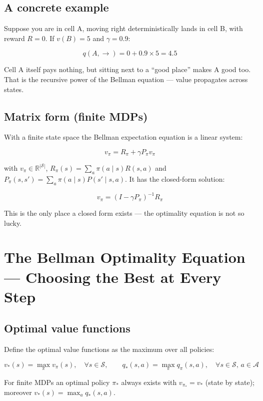 \documentclass{article}
\begin{document}
\subsection*{A concrete example}

Suppose you are in cell A, moving right deterministically lands in cell B, with reward $R=0$. If $v(B)=5$ and $\gamma=0.9$:

\[
q(A, \rightarrow) = 0 + 0.9 \times 5 = 4.5
\]

Cell A itself pays nothing, but sitting next to a ``good place'' makes A good too. That is the recursive power of the Bellman equation --- value propagates across states.

\subsection*{Matrix form (finite MDPs)}

With a finite state space the Bellman expectation equation is a linear system:

\[
\boxed{v_\pi = R_\pi + \gamma P_\pi v_\pi}
\]

with $v_\pi\in\mathbb{R}^{|\mathcal{S}|}$, $R_\pi(s)=\sum_a \pi(a\mid s)R(s,a)$ and $P_\pi(s,s')=\sum_a \pi(a\mid s)P(s'\mid s,a)$. It has the closed-form solution:

\[
v_\pi = (I - \gamma P_\pi)^{-1} R_\pi
\]

This is the only place a closed form exists --- the optimality equation is not so lucky.

\section*{The Bellman Optimality Equation --- Choosing the Best at Every Step}

\subsection*{Optimal value functions}

Define the optimal value functions as the maximum over all policies:

\[
v_*(s) = \max_\pi v_\pi(s),\quad \forall s\in\mathcal{S}, \qquad
q_*(s,a) = \max_\pi q_\pi(s,a),\quad \forall s\in\mathcal{S},\, a\in\mathcal{A}
\]

For finite MDPs an optimal policy $\pi_*$ always exists with $v_{\pi_*}=v_*$ (state by state); moreover $v_*(s)=\max_a q_*(s,a)$.
\end{document}
